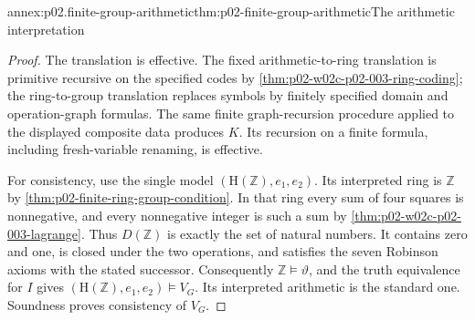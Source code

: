 \begin{annexitem}{annex:p02.finite-group-arithmetic}{thm:p02-finite-group-arithmetic}{The arithmetic interpretation}
\begin{proof}
The translation is effective. The fixed arithmetic-to-ring translation
is primitive recursive on the specified codes by
\cref{thm:p02-w02c-p02-003-ring-coding}; the ring-to-group translation
replaces symbols by finitely specified domain and operation-graph
formulas. The same finite graph-recursion procedure applied to the
displayed composite data produces \(K\). Its recursion on a finite
formula, including fresh-variable renaming, is effective.

For consistency, use the single model
\((\mathrm H(\mathbb Z),e_1,e_2)\).
Its interpreted ring is \(\mathbb Z\) by
\cref{thm:p02-finite-ring-group-condition}. In that ring every sum of
four squares is nonnegative, and every nonnegative integer is such a
sum by \cref{thm:p02-w02c-p02-003-lagrange}. Thus \(D(\mathbb Z)\)
is exactly the set of natural numbers. It contains zero and one, is
closed under the two operations, and satisfies the seven Robinson
axioms with the stated successor. Consequently
\(\mathbb Z\models\vartheta\), and the truth equivalence for \(I\)
gives \((\mathrm H(\mathbb Z),e_1,e_2)\models V_G\). Its interpreted
arithmetic is the standard one.
Soundness proves consistency of \(V_G\).
\end{proof}
\end{annexitem}

